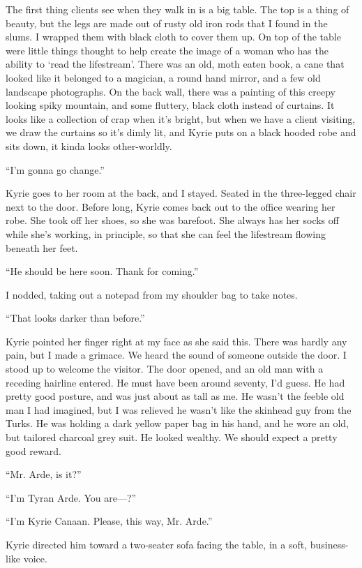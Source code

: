 \documentclass[oneside]{book}
\begin{document}
The first thing clients see when they walk in is a big table. The top is a thing of beauty, but the legs are made out of rusty old iron rods that I found in the slums. I wrapped them with black cloth to cover them up. On top of the table were little things thought to help create the image of a woman who has the ability to ‘read the lifestream’. There was an old, moth eaten book, a cane that looked like it belonged to a magician, a round hand mirror, and a few old landscape photographs. On the back wall, there was a painting of this creepy looking spiky mountain, and some fluttery, black cloth instead of curtains. It looks like a collection of crap when it’s bright, but when we have a client visiting, we draw the curtains so it’s dimly lit, and Kyrie puts on a black hooded robe and sits down, it kinda looks other-worldly.

“I’m gonna go change.”

Kyrie goes to her room at the back, and I stayed. Seated in the three-legged chair next to the door. Before long, Kyrie comes back out to the office wearing her robe. She took off her shoes, so she was barefoot. She always has her socks off while she’s working, in principle, so that she can feel the lifestream flowing beneath her feet.

“He should be here soon. Thank for coming.”

I nodded, taking out a notepad from my shoulder bag to take notes.

“That looks darker than before.”

Kyrie pointed her finger right at my face as she said this. There was hardly any pain, but I made a grimace. We heard the sound of someone outside the door. I stood up to welcome the visitor. The door opened, and an old man with a receding hairline entered. He must have been around seventy, I’d guess. He had pretty good posture, and was just about as tall as me. He wasn’t the feeble old man I had imagined, but I was relieved he wasn’t like the skinhead guy from the Turks. He was holding a dark yellow paper bag in his hand, and he wore an old, but tailored charcoal grey suit. He looked wealthy. We should expect a pretty good reward.

“Mr. Arde, is it?”

“I’m Tyran Arde. You are—?”

“I’m Kyrie Canaan. Please, this way, Mr. Arde.”

Kyrie directed him toward a two-seater sofa facing the table, in a soft, business-like voice.
\end{document}
